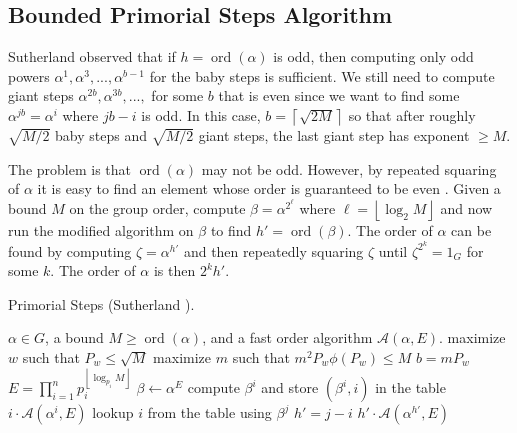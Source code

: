 \documentclass{ucalgthes1}
\theoremstyle{definition}
\DeclareMathOperator{\ord}{ord}
\newcommand{\floor}[1]{\left\lfloor #1 \right\rfloor}
\newcommand{\ceil}[1]{\left\lceil #1 \right\rceil}
\begin{document}
\subsection{Bounded Primorial Steps Algorithm}
\label{subsec:boundedPrimorialSteps}

Sutherland observed \cite[p.56]{Sutherland2007} that if $h = \ord(\alpha)$ is odd, then computing only odd powers $\alpha^1, \alpha^3, ..., \alpha^{b-1}$ for the baby steps is sufficient.  We still need to compute giant steps $\alpha^{2b}, \alpha^{3b}, ...,$ for some $b$ that is even since we want to find some $\alpha^{jb} = \alpha^i$ where $jb - i$ is odd.  In this case, $b = \ceil{\sqrt{2M}}$ so that after roughly $\sqrt{M/2}$ baby steps and $\sqrt{M/2}$ giant steps, the last giant step has exponent $\ge M$.

The problem is that $\ord(\alpha)$ may not be odd.  However, by repeated squaring of $\alpha$ it is easy to find an element whose order is guaranteed to be even \cite[p.56]{Sutherland2007}.  Given a bound $M$ on the group order, compute $\beta = \alpha^{2^\ell}$ where $\ell = \floor{\log_2 M}$ and now run the modified algorithm on $\beta$ to find $h' = \ord(\beta)$.  The order of $\alpha$ can be found by computing $\zeta = \alpha^{h'}$ and then repeatedly squaring $\zeta$ until $\zeta^{2^k} = 1_G$ for some $k$.  The order of $\alpha$ is then $2^k h'$.

\begin{algorithm}[h]
\caption{Primorial Steps (Sutherland \cite[p.57]{Sutherland2007}).}
\label{alg:primorial}
\begin{algorithmic}[1]
\REQUIRE $\alpha \in G$, a bound $M \ge \ord(\alpha)$, and a fast order algorithm $\mathcal A(\alpha, E)$.
\STATE maximize $w$ such that $P_w \le \sqrt{M}$
\STATE maximize $m$ such that $m^2P_w\phi(P_w) \le M$
\STATE $b = mP_w$
\STATE $E = \prod_{i=1}^n p_i^{\floor{\log_{p_i} M}}$
\STATE $\beta \gets \alpha^E$
	\STATE compute $\beta^i$ and store $(\beta^i, i)$ in the table 
		\RETURN $i \cdot \mathcal A(\alpha^i, E)$
	\ENDIF
\ENDFOR
{}
		\STATE lookup $i$ from the table using $\beta^j$ 
		\STATE $h' = j - i$
		\RETURN $h' \cdot \mathcal A(\alpha^{h'}, E)$
	\ENDIF
\ENDFOR
\end{algorithmic}
\end{algorithm}
\end{document}
